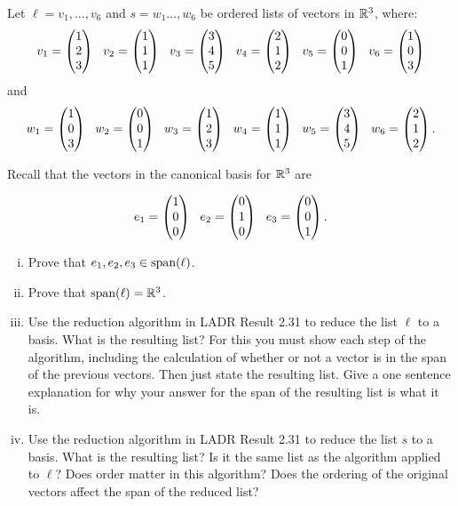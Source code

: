 
\begin{question}\label{que:ReductionAlgorithm}
	\normalfont
	
	
	Let $\ell=v_1,\dots, v_6$ and $s=w_1\dots,w_6$ be ordered lists of vectors in ${\mathbb R}^3$, where:
	\begin{align*}
		v_1 = \ColVecThree{1}{2}{3}\ \ 
		v_2 = \ColVecThree{1}{1}{1}\ \
		v_3 = \ColVecThree{3}{4}{5}\ \ 
		v_4 = \ColVecThree{2}{1}{2}\ \ 
		v_5 = \ColVecThree{0}{0}{1}\ \ 
		v_6 = \ColVecThree{1}{0}{3}
	\end{align*}
	and
	\begin{align*}
		w_1 = \ColVecThree{1}{0}{3}\ \ 
		w_2 = \ColVecThree{0}{0}{1}\ \
		w_3 = \ColVecThree{1}{2}{3}\ \ 
		w_4 = \ColVecThree{1}{1}{1}\ \ 
		w_5 = \ColVecThree{3}{4}{5}\ \ 
		w_6 = \ColVecThree{2}{1}{2}.
	\end{align*}
	
	\vspace{.2cm}
	
	Recall that the vectors in the canonical basis for ${\mathbb R}^3$ are
	
	\begin{align*}
		e_1 = \begin{pmatrix} 1\\ 0\\ 0\end{pmatrix}\ \
		e_2 = \begin{pmatrix} 0\\ 1\\ 0\end{pmatrix}\ \
		e_3 = \begin{pmatrix} 0\\ 0\\ 1\end{pmatrix}. 
	\end{align*}
	
	\vspace{.2cm}
	\begin{enumerate}[(i)]
		\item Prove that $e_1,e_2,e_3\in\textnormal{span}(\ell)$.
		\item Prove that $\textnormal{span}(\ell)={\mathbb R}^3$.
		\item Use the reduction algorithm in LADR Result 2.31 to reduce the list $\ell$ to a basis.  What is the resulting list?    For this you must show each step of the algorithm, including the calculation of whether or not a vector is in the span of the previous vectors.  Then just state the resulting list.  Give a one sentence explanation for why your answer for the span of the resulting list is what it is.
		\item Use the reduction algorithm in LADR Result 2.31 to reduce the list $s$ to a basis.  What is the resulting list?  Is it the same list as the algorithm applied to $\ell$?  Does order matter in this algorithm?  Does the ordering of the original vectors affect the span of the reduced list?
	\end{enumerate}
\end{question}

